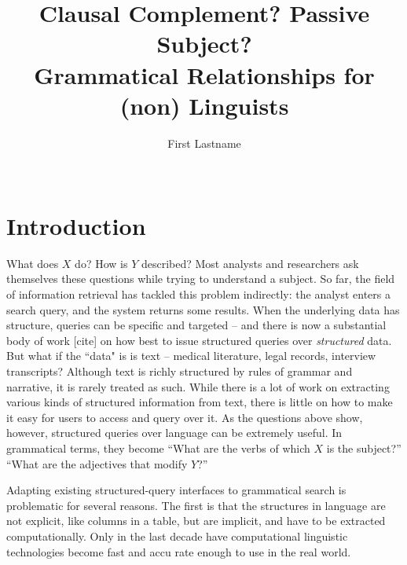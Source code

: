 \documentclass{sigchi}
\begin{document}
\title{Clausal Complement? Passive Subject?\\Grammatical Relationships for (non) Linguists}

\author{%
\alignauthor First Lastname\\
\\
}

\maketitle

\begin{abstract}

\end{abstract}

\section{Introduction}

What does $X$ do? How is $Y$ described? Most analysts and researchers ask themselves these questions while trying to understand a subject.  So far, the field of information retrieval has tackled this problem indirectly: the analyst enters a search query, and the system returns some results. When the underlying data has structure, queries can be specific and targeted -- and there is now a substantial body of work [cite] on how best to issue structured queries over \emph{structured} data. But what if the ``data" is is text -- medical literature, legal records, interview transcripts? Although text is richly structured by rules of  grammar and narrative, it is rarely treated as such. While there is a lot of work on extracting various kinds of structured information from text, there is little on how to make it easy for users to access and query over it.  As the questions above show, however, structured queries over language can be extremely useful. In grammatical terms, they become ``What are the verbs of which $X$ is the subject?'' ``What are the adjectives that modify $Y$?''  

Adapting existing structured-query interfaces to grammatical search is problematic for several reasons. The first is that the structures in language are not explicit, like columns in a table, but are implicit, and have to be extracted computationally. Only in the last decade have computational linguistic technologies become fast and accu rate enough to use in the real world. 
\end{document}
